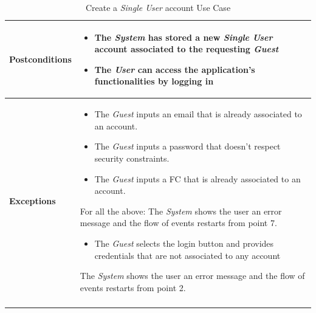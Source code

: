 \documentclass[titlepage]{article}
\begin{document}
\begin{longtable}{| p{3 cm} | p{10 cm} |}
			 \\
			\hline
			{\bf Postconditions} & 
							\begin{itemize}
								\item The {\it System} has stored a new {\it Single User} account associated to the 										requesting {\it Guest}
								\item The {\it User} can access the application’s functionalities by logging in
							\end{itemize}
			\\
			\hline
			{\bf Exceptions} & 
							\begin{itemize}
								\item The {\it {\it Guest}} inputs an email that is already associated to an account. 
								\item The {\it {\it Guest}} inputs a password that doesn’t respect security constraints. 								\item The 	{\it {\it Guest}} inputs a FC that is already associated to an account. 
							\end{itemize} 
							For all the above: The {\it System} shows the user an error message and the flow of events restarts from point 7.
							\begin{itemize}
								\item The {\it {\it Guest}}  selects the login button and provides credentials that are not 									associated to any account
							\end{itemize} 
							The {\it System} shows the user an error message and the flow of events 							restarts from point 2.
							
			\\
			\hline
			\caption{Create a {\it Single User} account Use Case}
			\end{longtable}
			
			
\end{document}

